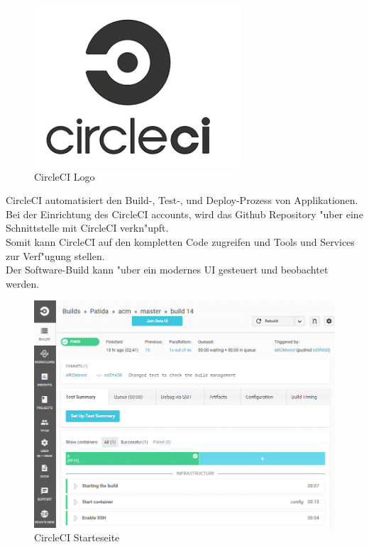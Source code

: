 \documentclass[a4paper, 11pt]{scrreprt}
\begin{document}
\begin{figure} [H]
\begin{center}
\includegraphics[scale=0.7]{circle.png}
\caption{CircleCI Logo}
\label{circleci}
\end{center}
\end{figure}

CircleCI automatisiert den Build-, Test-, und Deploy-Prozess von Applikationen.
Bei der Einrichtung des CircleCI accounts, wird das Github Repository "uber eine Schnittstelle mit CircleCI verkn"upft. \\
Somit kann CircleCI auf den kompletten Code zugreifen und Tools und Services zur Verf"ugung stellen. \\

Der Software-Build kann "uber ein modernes UI gesteuert und beobachtet werden. \\

\begin{figure} [H]
\begin{center}
\includegraphics[scale=0.7]{build1.png}
\caption{CircleCI Starteseite}
\label{circleci}
\end{center}
\end{figure}
\end{document}
